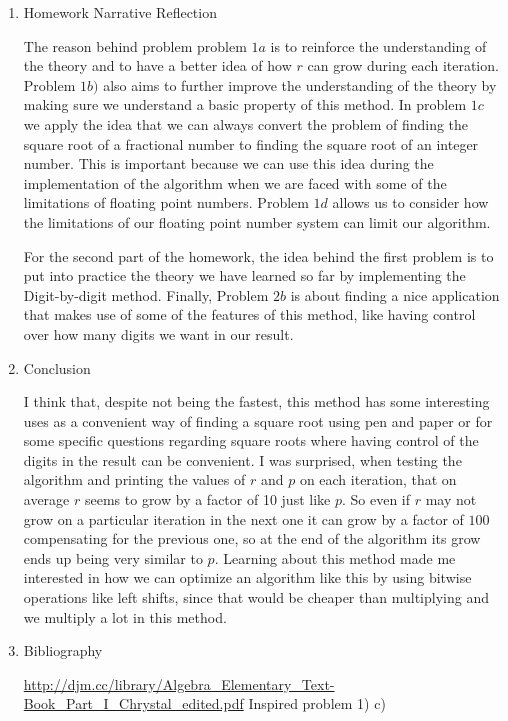 \documentclass{uofa_template}
\begin{document}
\begin{enumerate}
 \pagebreak
 
\item Homework Narrative Reflection

The reason behind problem problem $1a$ is to reinforce the understanding of the theory and to have a better idea of how $r$ can grow during each iteration. Problem $1b)$ also aims to further improve the understanding of the theory by making sure we understand a basic property of this method. In problem $1c$ we apply the idea that we can always convert the problem of finding the square root of a fractional number to finding the square root of an integer number. This is important because we can use this idea during the implementation of the algorithm when we are faced with some of the limitations of floating point numbers. Problem $1d$ allows us to consider how the limitations of our floating point number system can limit our algorithm.

For the second part of the homework, the idea behind the first problem is to put into practice the theory we have learned so far by implementing the Digit-by-digit method. Finally, Problem $2b$ is about finding a nice application that makes use of some of the features of this method, like having control over how many digits we want in our result.

\item Conclusion

I think that, despite not being the fastest, this method has some interesting uses as a convenient way of finding a square root using pen and paper or for some specific questions regarding square roots where having control of the digits in the result can be convenient. I was surprised, when testing the algorithm and printing the values of $r$ and $p$ on each iteration, that on average $r$ seems to grow by a factor of 10 just like $p$. So even if $r$ may not grow on a particular iteration in the next one it can grow by a factor of $100$ compensating for the previous one, so at the end of the algorithm its grow ends up being very similar to $p$. Learning about this method made me interested in how we can optimize an algorithm like this by using bitwise operations like left shifts, since that would be cheaper than multiplying and we multiply a lot in this method.

\item Bibliography

\url{http://djm.cc/library/Algebra_Elementary_Text-Book_Part_I_Chrystal_edited.pdf}
Inspired problem 1) c)


\end{enumerate}
\end{document}
